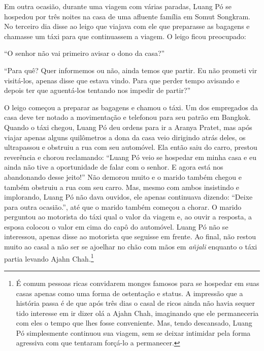 Em outra ocasião, durante uma viagem com várias paradas, Luang Pó se
hospedou por três noites na casa de uma afluente família em Somut
Songkram. No terceiro dia disse ao leigo que viajava com ele que
preparasse as bagagens e chamasse um táxi para que continuassem a
viagem. O leigo ficou preocupado:

``O senhor não vai primeiro avisar o dono da casa?''

``Para quê? Quer informemos ou não, ainda temos que partir. Eu não
prometi vir visitá-los, apenas disse que estava vindo. Para que perder
tempo avisando e depois ter que aguentá-los tentando nos impedir de
partir?''

\enlargethispage{\baselineskip}

O leigo começou a preparar as bagagens e chamou o táxi. Um dos
empregados da casa deve ter notado a movimentação e telefonou para seu
patrão em Bangkok. Quando o táxi chegou, Luang Pó deu ordens para ir a
Aranya Pratet, mas após viajar apenas alguns quilômetros a dona da casa
veio dirigindo atrás deles, os ultrapassou e obstruiu a rua com seu
automóvel. Ela então saiu do carro, prestou reverência e chorou
reclamando: ``Luang Pó veio se hospedar em minha casa e eu ainda não
tive a oportunidade de falar com o senhor. E agora está nos abandonando
desse jeito!'' Não demorou muito e o marido também chegou e também
obstruiu a rua com seu carro. Mas, mesmo com ambos insistindo e
implorando, Luang Pó não dava ouvidos, ele apenas continuava dizendo:
``Deixe para outra ocasião.'', até que o marido também começou a chorar.
O marido perguntou ao motorista do táxi qual o valor da viagem e, ao
ouvir a resposta, a esposa colocou o valor em cima do capô do automóvel.
Luang Pó não se interessou, apenas disse ao motorista que seguisse em
frente. Ao final, não restou muito ao casal a não ser se ajoelhar no
chão com mãos em \emph{añjali} enquanto o táxi partia levando Ajahn
Chah.\footnote{É comum pessoas ricas convidarem monges famosos para se
  hospedar em suas casas apenas como uma forma de ostentação e status. A
  impressão que a história passa é de que após três dias o casal de
  ricos ainda não havia sequer tido interesse em ir dizer olá a Ajahn
  Chah, imaginando que ele permaneceria com eles o tempo que lhes fosse
  conveniente. Mas, tendo descansado, Luang Pó simplesmente continuou
  sua viagem, sem se deixar intimidar pela forma agressiva com que
  tentaram forçá-lo a permanecer.}

